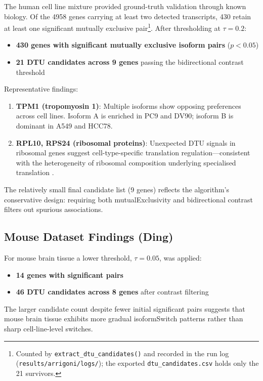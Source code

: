 The human cell line mixture provided ground-truth validation through known biology. Of the 4958 genes carrying at least two detected transcripts, 430 retain at least one significant mutually exclusive pair\footnote{Counted by \texttt{extract\_dtu\_candidates()} and recorded in the run log (\texttt{results/arrigoni/logs/}); the exported \texttt{dtu\_candidates.csv} holds only the 21 survivors.}. After thresholding at $\tau = 0.2$:
\begin{itemize}
    \item \textbf{430 genes with significant mutually exclusive isoform pairs} ($p < 0.05$)
    \item \textbf{21 DTU candidates across 9 genes} passing the bidirectional contrast threshold
\end{itemize}

Representative findings:
\begin{enumerate}
    \item \textbf{TPM1 (tropomyosin 1)}: Multiple isoforms show opposing preferences across cell lines. Isoform A is enriched in PC9 and DV90; isoform B is dominant in A549 and HCC78.
    
    \item \textbf{RPL10, RPS24 (ribosomal proteins)}: Unexpected DTU signals in ribosomal genes suggest cell-type-specific translation regulation---consistent with the heterogeneity of ribosomal composition underlying specialised translation \cite{xue2012specialized}.
\end{enumerate}

The relatively small final candidate list (9 genes) reflects the algorithm's conservative design: requiring both \gls{mutualExclusivity} and bidirectional contrast filters out spurious associations.

\subsection*{Mouse Dataset Findings (Ding)}\label{sec:results-mouse}

For mouse brain tissue a lower threshold, $\tau = 0.05$, was applied:
\begin{itemize}
    \item \textbf{14 genes with significant pairs}
    \item \textbf{46 DTU candidates across 8 genes} after contrast filtering
\end{itemize}

The larger candidate count despite fewer initial significant pairs suggests that mouse brain tissue exhibits more gradual \gls{isoformSwitch} patterns rather than sharp cell-line-level switches.

